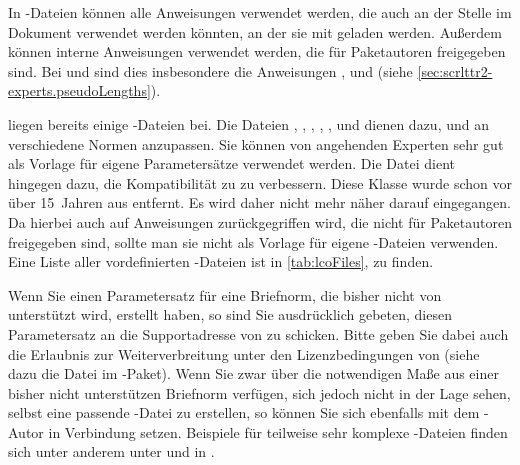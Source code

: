 In -Dateien können alle Anweisungen verwendet werden, die auch an
der Stelle im Dokument verwendet werden könnten, an der %
sie mit 
geladen werden. Außerdem können interne Anweisungen verwendet werden, die für
Paketautoren freigegeben sind. Bei  und 
sind dies insbesondere die Anweisungen
,
 und
 (siehe
\autoref{sec:scrlttr2-experts.pseudoLengths}).

\KOMAScript{} liegen bereits einige -Dateien bei. Die Dateien
, , , ,
,  und
 dienen dazu, 
und  an verschiedene Normen anzupassen. Sie
können von angehenden Experten sehr gut als Vorlage für eigene Parametersätze
verwendet werden. Die Datei  dient hingegen dazu, die
Kompatibilität zu  zu verbessern. Diese
Klasse wurde schon vor über 15~Jahren aus \KOMAScript{} entfernt. Es wird
daher nicht mehr näher darauf eingegangen. Da hierbei auch auf Anweisungen
zurückgegriffen wird, die nicht für Paketautoren freigegeben sind, sollte man
sie nicht als Vorlage für eigene -Dateien verwenden. Eine Liste
aller vordefinierten -Dateien ist in \autoref{tab:lcoFiles},
 zu finden.

Wenn Sie einen Parametersatz für eine Briefnorm, die bisher nicht von
\KOMAScript{} unterstützt wird, erstellt haben, so sind Sie ausdrücklich
gebeten, diesen Parametersatz an die Supportadresse von \KOMAScript{} zu
schicken. Bitte geben Sie dabei auch die Erlaubnis zur Weiterverbreitung unter
den Lizenzbedingungen von \KOMAScript{} (siehe dazu die Datei
\href{http://mirrors.ctan.org/macros/latex/contrib/koma-script/doc/lppl-de.txt}%
{} im \KOMAScript-Paket). Wenn Sie zwar über die notwendigen
Maße aus einer bisher nicht unterstützen Briefnorm verfügen, sich jedoch nicht
in der Lage sehen, selbst eine passende -Datei zu erstellen, so
können Sie sich ebenfalls mit dem \KOMAScript-Autor in Verbindung
setzen. Beispiele für teilweise sehr komplexe -Dateien finden sich
unter anderem unter \cite{homepage} und in \cite{DANTE:TK0203:MJK}.


